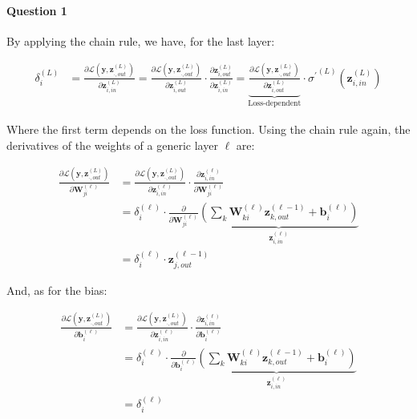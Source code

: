 \documentclass[
  a4paper,
]{article}
\begin{document}
\hypertarget{question-1}{%
\paragraph{Question 1}\label{question-1}}

By applying the chain rule, we have, for the last layer:

\begin{align}
\delta^{(L)}_i
&=\frac{\partial\mathcal{L}(\textbf{y},\textbf{z}^{(L)}_{\cdot,out})}{\partial\textbf{z}^{(L)}_{i,in}}
=\frac{\partial\mathcal{L}(\textbf{y},\textbf{z}^{(L)}_{\cdot,out})}{\partial\textbf{z}^{(L)}_{i,out}}
  \cdot\frac{\partial\textbf{z}^{(L)}_{i,out}}{\partial\textbf{z}^{(L)}_{i,in}}
=
\underbrace{
  \frac{\partial\mathcal{L}(\textbf{y},\textbf{z}^{(L)}_{\cdot,out})}{\partial\textbf{z}^{(L)}_{i,out}}
}_{\text{Loss-dependent}}\cdot{\sigma^\prime}^{(L)}(\textbf{z}^{(L)}_{i,in})
\end{align}

Where the first term depends on the loss function. Using the chain rule
again, the derivatives of the weights of a generic layer \(\ell\) are:

\begin{align}
\frac{
  \partial \mathcal{L}(\textbf{y},\textbf{z}^{(L)}_{\cdot,out})
}{
  \partial \textbf{W}^{(\ell)}_{ji}
}
&=\frac{
  \partial \mathcal{L}(\textbf{y},\textbf{z}^{(L)}_{\cdot,out})
}{
  \partial \textbf{z}^{(\ell)}_{i,in}
}\cdot\frac{
  \partial \textbf{z}^{(\ell)}_{i,in}
}{
  \partial \textbf{W}^{(\ell)}_{ji}
} \\
&=\delta^{(\ell)}_i\cdot\frac{
  \partial
}{
  \partial \textbf{W}^{(\ell)}_{ji}
}\underbrace{\left(
  \sum_k\textbf{W}^{(\ell)}_{ki}\textbf{z}^{(\ell-1)}_{k,out}+\textbf{b}^{(\ell)}_{i}
\right)}_{\textbf{z}^{(\ell)}_{i,in}} \\
&=\delta^{(\ell)}_i\cdot\textbf{z}^{(\ell-1)}_{j,out}
\end{align}

And, as for the bias:

\begin{align}
\frac{
  \partial \mathcal{L}(\textbf{y},\textbf{z}^{(L)}_{\cdot,out})
}{
    \partial \textbf{b}^{(\ell)}_{i}
}
&=\frac{
  \partial \mathcal{L}(\textbf{y},\textbf{z}^{(L)}_{\cdot,out})
}{
  \partial \textbf{z}^{(\ell)}_{i,in}
}\cdot\frac{
  \partial \textbf{z}^{(\ell)}_{i,in}
}{
  \partial \textbf{b}^{(\ell)}_{i}
} \\
&=\delta^{(\ell)}_i\cdot\frac{
  \partial
}{
  \partial \textbf{b}^{(\ell)}_{i}
}\underbrace{\left(
  \sum_k\textbf{W}^{(\ell)}_{ki}\textbf{z}^{(\ell-1)}_{k,out}+\textbf{b}^{(\ell)}_{i}
\right)}_{\textbf{z}^{(\ell)}_{i,in}} \\
&=\delta^{(\ell)}_i
\end{align}
\end{document}
